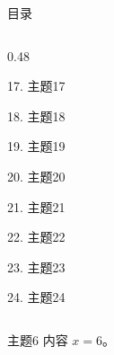 \documentclass[aspectratio=169,10pt,fontset=fandol]{ctexbeamer}
\begin{document}
\begin{frame}[t,fragile]{目录}
\begin{columns}[T,onlytextwidth]
\begin{column}{0.48\textwidth}
{\color{gray!40}\small 17. 主题17\par}\vspace{0.22em}
{\color{gray!40}\small 18. 主题18\par}\vspace{0.22em}
{\color{gray!40}\small 19. 主题19\par}\vspace{0.22em}
{\color{gray!40}\small 20. 主题20\par}\vspace{0.22em}
{\color{gray!40}\small 21. 主题21\par}\vspace{0.22em}
{\color{gray!40}\small 22. 主题22\par}\vspace{0.22em}
{\color{gray!40}\small 23. 主题23\par}\vspace{0.22em}
{\color{gray!40}\small 24. 主题24\par}\vspace{0.22em}
\end{column}
\end{columns}
\end{frame}
\begin{frame}[t,fragile]{主题6}
\normalsize
{\normalsize
内容 $x=6$。
}
\end{frame}
\end{document}
